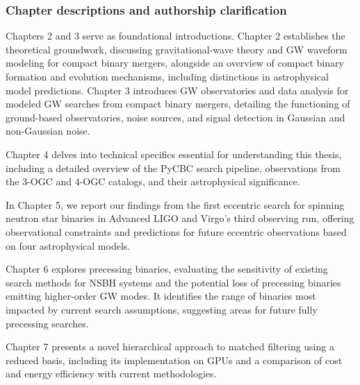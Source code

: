 


 



\subsubsection{Chapter descriptions and authorship clarification}

Chapters 2 and 3 serve as foundational introductions. Chapter 2 establishes the theoretical groundwork, discussing gravitational-wave theory and GW waveform modeling for compact binary mergers, alongside an overview of compact binary formation and evolution mechanisms, including distinctions in astrophysical model predictions. Chapter 3 introduces GW observatories and data analysis for modeled GW searches from compact binary mergers, detailing the functioning of ground-based observatories, noise sources, and signal detection in Gaussian and non-Gaussian noise.

Chapter 4 delves into technical specifics essential for understanding this thesis, including a detailed overview of the PyCBC search pipeline, observations from the 3-OGC and 4-OGC catalogs, and their astrophysical significance.

In Chapter 5, we report our findings from the first eccentric search for spinning neutron star binaries in Advanced LIGO and Virgo's third observing run, offering observational constraints and predictions for future eccentric observations based on four astrophysical models.

Chapter 6 explores precessing binaries, evaluating the sensitivity of existing search methods for NSBH systems and the potential loss of precessing binaries emitting higher-order GW modes. It identifies the range of binaries most impacted by current search assumptions, suggesting areas for future fully precessing searches.

Chapter 7 presents a novel hierarchical approach to matched filtering using a reduced basis, including its implementation on GPUs and a comparison of cost and energy efficiency with current methodologies.

